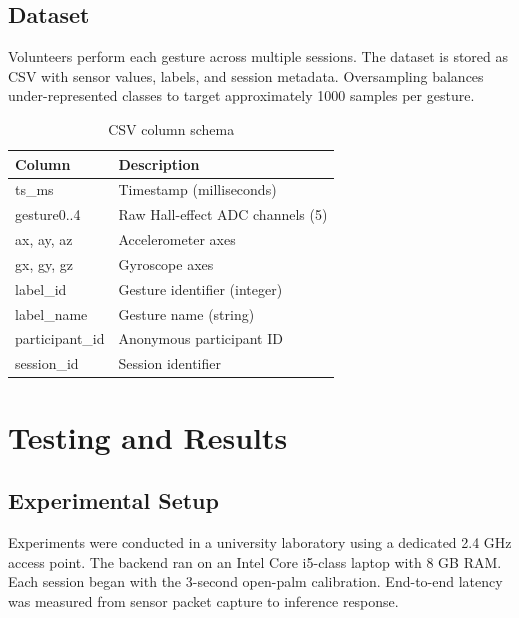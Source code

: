 \documentclass[12pt,a4paper]{report}
\begin{document}
\section{Dataset}
Volunteers perform each gesture across multiple sessions. The dataset is stored
as CSV with sensor values, labels, and session metadata. Oversampling balances
under-represented classes to target approximately 1000 samples per gesture.

\begin{table}[H]
  \centering
  \caption{CSV column schema}
  \begin{tabularx}{\textwidth}{@{}lX@{}}
    \toprule
    Column & Description \\
    \midrule
    ts\_ms          & Timestamp (milliseconds) \\
    gesture0..4     & Raw Hall-effect ADC channels (5) \\
    ax, ay, az      & Accelerometer axes \\
    gx, gy, gz      & Gyroscope axes \\
    label\_id       & Gesture identifier (integer) \\
    label\_name     & Gesture name (string) \\
    participant\_id & Anonymous participant ID \\
    session\_id     & Session identifier \\
    \bottomrule
  \end{tabularx}
\end{table}

\chapter{Testing and Results}
\section{Experimental Setup}
Experiments were conducted in a university laboratory using a dedicated 2.4 GHz
access point. The backend ran on an Intel Core i5-class laptop with 8 GB RAM.
Each session began with the 3-second open-palm calibration. End-to-end latency
was measured from sensor packet capture to inference response.
\end{document}
